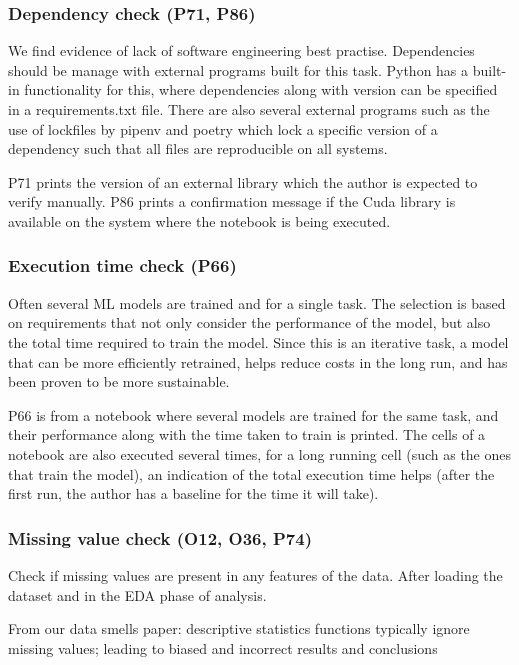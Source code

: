\subsubsection{Dependency check (P71, P86)}

We find evidence of lack of software engineering best practise. Dependencies should be manage with external programs built for this task. Python has a built-in functionality for this, where dependencies along with version can be specified in a requirements.txt file. There are also several external programs such as the use of lockfiles by pipenv and poetry which lock a specific version of a dependency such that all files are reproducible on all systems.

P71 prints the version of an external library which the author is expected to verify manually. P86 prints a confirmation message if the Cuda library is available on the system where the notebook is being executed.

\subsubsection{Execution time check (P66)}

Often several ML models are trained and for a single task. The selection is based on requirements that not only consider the performance of the model, but also the total time required to train the model. Since this is an iterative task, a model that can be more efficiently retrained, helps reduce costs in the long run, and has been proven to be more sustainable.

P66 is from a notebook where several models are trained for the same task, and their performance along with the time taken to train is printed. The cells of a notebook are also executed several times, for a long running cell (such as the ones that train the model), an indication of the total execution time helps (after the first run, the author has a baseline for the time it will take).

\subsubsection{Missing value check (O12, O36, P74)}

Check if missing values are present in any features of the data. After loading the dataset and in the EDA phase of analysis.

From our data smells paper: descriptive statistics functions typically ignore missing values; leading to biased and incorrect results and conclusions


